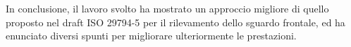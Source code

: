 \documentclass[12pt,a4paper,openright,twoside]{book}
\begin{document}
In conclusione, il lavoro svolto ha mostrato un approccio migliore di quello proposto nel draft ISO 29794-5 per il rilevamento dello sguardo frontale, ed ha enunciato diversi spunti per migliorare ulteriormente le prestazioni.




\backmatter



\end{document}
